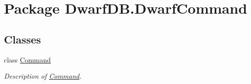 \hypertarget{namespace_dwarf_d_b_1_1_dwarf_command}{\section{Package Dwarf\+D\+B.\+Dwarf\+Command}
\label{namespace_dwarf_d_b_1_1_dwarf_command}
}
\subsection*{Classes}
\begin{DoxyCompactItemize}
\item 
class \hyperlink{class_dwarf_d_b_1_1_dwarf_command_1_1_command}{Command}
\begin{DoxyCompactList}\small\item\em Description of \hyperlink{class_dwarf_d_b_1_1_dwarf_command_1_1_command}{Command}. \end{DoxyCompactList}\end{DoxyCompactItemize}
